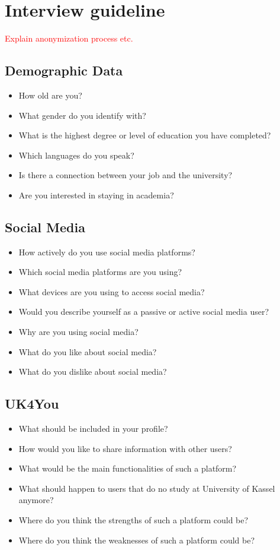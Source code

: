 \section{Interview guideline}
\textcolor{red}{Explain anonymization process etc. }

\subsection{Demographic Data}
\begin{itemize}
    \item How old are you?
    \item What gender do you identify with?
    \item What is the highest degree or level of education you have completed?
    \item Which languages do you speak?
    \item Is there a connection between your job and the university?
    \item Are you interested in staying in academia?
\end{itemize}

\subsection{Social Media}
\begin{itemize}
    \item How actively do you use social media platforms?
    \item Which social media platforms are you using?
    \item What devices are you using to access social media?
    \item Would you describe yourself as a passive or active social media user?
    \item Why are you using social media?
    \item What do you like about social media?
    \item What do you dislike about social media?
\end{itemize}

\subsection{UK4You}
\begin{itemize}
    \item What should be included in your profile?
    \item How would you like to share information with other users?
    \item What would be the main functionalities of such a platform?
    \item What should happen to users that do no study at University of Kassel anymore?
    \item Where do you think the strengths of such a platform could be?
    \item Where do you think the weaknesses of such a platform could be?
\end{itemize}